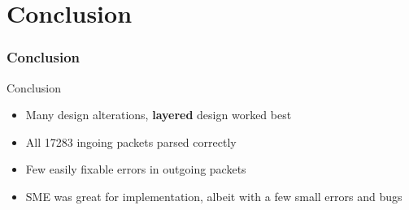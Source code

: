 \section{Conclusion}
\begin{frame}
  \frametitle{Conclusion}


\begin{block}{Conclusion}
\begin{itemize}
	\item Many design alterations, \textbf{layered} design worked best
\item All 17283 ingoing packets parsed correctly
\item Few easily fixable errors in outgoing packets
\item SME was great for implementation, albeit with a few small errors and bugs

\end{itemize}

\end{block}
\end{frame}

